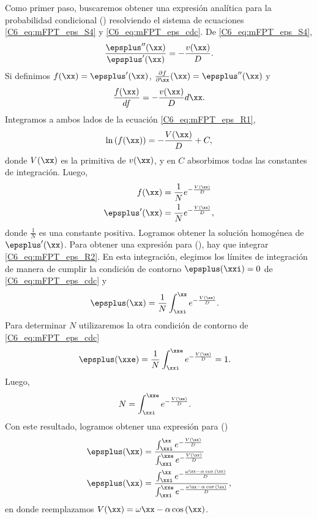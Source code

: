 {Como primer paso, buscaremos obtener una expresión analítica para la probabilidad condicional \epsplus(\xx) resolviendo el sistema de ecuaciones \ref{C6_eq:mFPT_eps_S4} y \ref{C6_eq:mFPT_eps_cdc}. De \ref{C6_eq:mFPT_eps_S4},
\begin{align}
     \frac{\epsplus''(\xx)}{\epsplus'(\xx)} = - \frac{v(\xx)}{D}.
\end{align}
Si definimos $f(\xx) = \epsplus'(\xx)$, $\frac{\partial f}{\partial\xx}(\xx) = \epsplus''(\xx) $ y
\begin{align}
     \frac{f(\xx)}{df} = - \frac{v(\xx)}{D} d\xx.
     \label{C6_eq:mFPT_eps_R1}
\end{align}
Integramos a ambos lados de la ecuación \ref{C6_eq:mFPT_eps_R1}, 
\begin{align}
     \ln{(f(\xx))} = - \frac{V(\xx)}{D} + C,
\end{align}
donde $V(\xx)$ es la primitiva de $v(\xx)$, y en $C$ absorbimos todas las constantes de integración. Luego,
\begin{align}
     f(\xx) &= \frac{1}{N} e^{- \frac{V(\xx)}{D}} \\
     \epsplus'(\xx) & =\frac{1}{N} e^{- \frac{V(\xx)}{D}}, 
     \label{C6_eq:mFPT_eps_R2}
\end{align}
donde $\frac{1}{N}$ es una constante positiva. Logramos obtener la solución homogénea de $\epsplus'(\xx)$. Para obtener una expresión para \epsplus(\xx), hay que integrar \ref{C6_eq:mFPT_eps_R2}. En esta integración, elegimos los límites de integración de manera de cumplir la condición de contorno $\epsplus(\xxi) = 0 $ de \ref{C6_eq:mFPT_eps_cdc} y
\begin{align}
     \epsplus(\xx) & = \frac{1}{N} \int_{\xxi}^\xx e^{- \frac{V(\xx)}{D}} .
\end{align}
Para determinar $N$ utilizaremos la otra condición de contorno de \ref{C6_eq:mFPT_eps_cdc}
\begin{align}
     \epsplus(\xxe) & = \frac{1}{N} \int_{\xxi}^{\xxe} e^{- \frac{V(\xx)}{D}} = 1. 
\end{align}
Luego,
\begin{align}
      N &= \int_{\xxi}^{\xxe} e^{- \frac{V(\xx)}{D}} . 
\end{align}
Con este resultado, logramos obtener una expresión para \epsplus(\xx) 
\begin{align}
     \epsplus(\xx) & = \frac{\int_{\xxi}^\xx e^{- \frac{V(\xx)}{D}}}{\int_{\xxi}^{\xxe} e^{- \frac{V(\xx)}{D}}} \\
     \epsplus(\xx) & = \frac{\int_{\xxi}^\xx e^{- \frac{\omega \xx - \alpha \cos{(\xx)}}{D}}}{\int_{\xxi}^{\xxe} e^{- \frac{\omega \xx - \alpha \cos{(\xx)}}{D}}},
     \label{C6_eq:mFPT_eps_res}
\end{align}
en donde reemplazamos $V(\xx) = \omega \xx - \alpha \cos{(\xx)}$.


}
